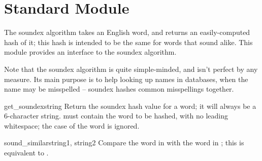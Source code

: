\section{Standard Module }

\renewcommand{\indexsubitem}{(in module soundex)}
The soundex algorithm takes an English word, and returns an
easily-computed hash of it; this hash is intended to be the same for
words that sound alike.  This module provides an interface to the
soundex algorithm.

Note that the soundex algorithm is quite simple-minded, and isn't
perfect by any measure.  Its main purpose is to help looking up names
in databases, when the name may be misspelled -- soundex hashes common
misspellings together.

\begin{funcdesc}{get_soundex}{string}
Return the soundex hash value for a word; it will always be a
6-character string.   must contain the word to be hashed,
with no leading whitespace; the case of the word is ignored.
\end{funcdesc}

\begin{funcdesc}{sound_similar}{string1, string2}
Compare the word in  with the word in ; this
is equivalent to 
.
\end{funcdesc}
